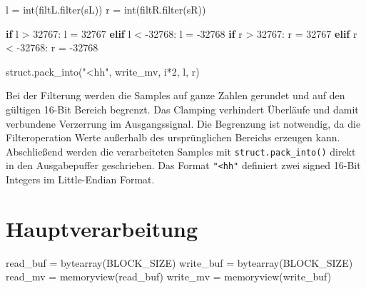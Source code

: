 \documentclass[
  ngerman,
  letterpaper,
  DIV=11]{scrreprt}
\newenvironment{Shaded}{\begin{snugshade}}{\end{snugshade}}
\newcommand{\BuiltInTok}[1]{\textcolor[rgb]{0.00,0.23,0.31}{#1}}
\newcommand{\ControlFlowTok}[1]{\textcolor[rgb]{0.00,0.23,0.31}{\textbf{#1}}}
\newcommand{\DecValTok}[1]{\textcolor[rgb]{0.68,0.00,0.00}{#1}}
\newcommand{\NormalTok}[1]{\textcolor[rgb]{0.00,0.23,0.31}{#1}}
\newcommand{\OperatorTok}[1]{\textcolor[rgb]{0.37,0.37,0.37}{#1}}
\newcommand{\StringTok}[1]{\textcolor[rgb]{0.13,0.47,0.30}{#1}}
\begin{document}
\begin{Shaded}
\begin{Highlighting}[]
\NormalTok{    l }\OperatorTok{=} \BuiltInTok{int}\NormalTok{(filtL.}\BuiltInTok{filter}\NormalTok{(sL))}
\NormalTok{    r }\OperatorTok{=} \BuiltInTok{int}\NormalTok{(filtR.}\BuiltInTok{filter}\NormalTok{(sR))}

    \ControlFlowTok{if}\NormalTok{ l }\OperatorTok{\textgreater{}} \DecValTok{32767}\NormalTok{: l }\OperatorTok{=} \DecValTok{32767}
    \ControlFlowTok{elif}\NormalTok{ l }\OperatorTok{\textless{}} \OperatorTok{{-}}\DecValTok{32768}\NormalTok{: l }\OperatorTok{=} \OperatorTok{{-}}\DecValTok{32768}
    \ControlFlowTok{if}\NormalTok{ r }\OperatorTok{\textgreater{}} \DecValTok{32767}\NormalTok{: r }\OperatorTok{=} \DecValTok{32767}
    \ControlFlowTok{elif}\NormalTok{ r }\OperatorTok{\textless{}} \OperatorTok{{-}}\DecValTok{32768}\NormalTok{: r }\OperatorTok{=} \OperatorTok{{-}}\DecValTok{32768}

\NormalTok{    struct.pack\_into(}\StringTok{"\textless{}hh"}\NormalTok{, write\_mv, i}\OperatorTok{*}\DecValTok{2}\NormalTok{, l, r)}
\end{Highlighting}
\end{Shaded}

Bei der Filterung werden die Samples auf ganze Zahlen gerundet und auf
den gültigen 16-Bit Bereich begrenzt. Das Clamping verhindert Überläufe
und damit verbundene Verzerrung im Ausgangssignal. Die Begrenzung ist
notwendig, da die Filteroperation Werte außerhalb des ursprünglichen
Bereichs erzeugen kann. Abschließend werden die verarbeiteten Samples
mit \texttt{struct.pack\_into()} direkt in den Ausgabepuffer
geschrieben. Das Format \texttt{"\textless{}hh"} definiert zwei signed
16-Bit Integers im Little-Endian Format.

\section{Hauptverarbeitung}\label{hauptverarbeitung}

\begin{Shaded}
\begin{Highlighting}[]
\NormalTok{    read\_buf }\OperatorTok{=} \BuiltInTok{bytearray}\NormalTok{(BLOCK\_SIZE)}
\NormalTok{    write\_buf }\OperatorTok{=} \BuiltInTok{bytearray}\NormalTok{(BLOCK\_SIZE)}
\NormalTok{    read\_mv }\OperatorTok{=} \BuiltInTok{memoryview}\NormalTok{(read\_buf)}
\NormalTok{    write\_mv }\OperatorTok{=} \BuiltInTok{memoryview}\NormalTok{(write\_buf)}
\end{Highlighting}
\end{Shaded}
\end{document}

